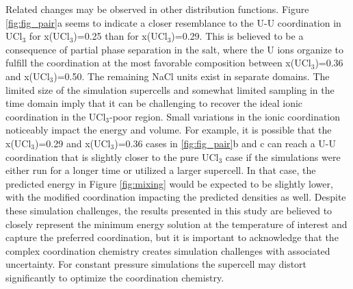 \documentclass[preprint,3p,10pt,onecolumn,number,sort&compress]{elsarticle}
\begin{document}
{Related changes may be observed in other distribution functions. Figure \ref{fig:fig_pair}a seems to indicate a closer resemblance to the U-U coordination in UCl$_3$ for x(UCl$_3$)=0.25 than for x(UCl$_3$)=0.29. This is believed to be a consequence of partial phase separation in the salt, where the U ions organize to fulfill the coordination at the most favorable composition between x(UCl$_3$)=0.36 and x(UCl$_3$)=0.50. The remaining NaCl units exist in separate domains. The limited size of the simulation supercells and somewhat limited sampling in the time domain imply that it can be challenging to recover the ideal ionic coordination in the UCl$_3$-poor region. Small variations in the ionic coordination noticeably impact the energy and volume. For example, it is possible that the x(UCl$_3$)=0.29 and x(UCl$_3$)=0.36 cases in \ref{fig:fig_pair}b and c can reach a U-U coordination that is slightly closer to the pure UCl$_3$ case if the simulations were either run for a longer time or utilized a larger supercell. In that case, the predicted energy in Figure \ref{fig:mixing} would be expected to be slightly lower, with the modified coordination impacting the predicted densities as well. Despite these simulation challenges, the results presented in this study are believed to closely represent the minimum energy solution at the temperature of interest and capture the preferred coordination, but it is important to acknowledge that the complex coordination chemistry creates simulation challenges with associated uncertainty. For constant pressure simulations the supercell may distort significantly to optimize the coordination chemistry.

}
\end{document}
